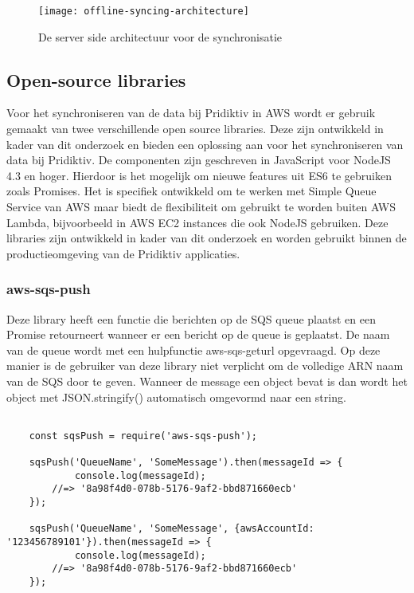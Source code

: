 \begin{figure}[h]
\caption{De server side architectuur voor de synchronisatie}
\centering
\texttt{[image: offline-syncing-architecture]}
\end{figure}

\subsection{Open-source libraries}
Voor het synchroniseren van de data bij Pridiktiv in AWS wordt er gebruik gemaakt van twee verschillende open source libraries. Deze zijn ontwikkeld in kader van dit onderzoek en bieden een oplossing aan voor het synchroniseren van data bij Pridiktiv. De componenten zijn geschreven in JavaScript voor NodeJS 4.3 en hoger. Hierdoor is het mogelijk om nieuwe features uit ES6 te gebruiken zoals Promises. Het is specifiek ontwikkeld om te werken met Simple Queue Service van AWS maar biedt de flexibiliteit om gebruikt te worden buiten AWS Lambda, bijvoorbeeld in AWS EC2 instances die ook NodeJS gebruiken. Deze libraries zijn ontwikkeld in kader van dit onderzoek en worden gebruikt binnen de productieomgeving van de Pridiktiv applicaties.
\subsubsection{aws-sqs-push}
Deze library heeft een functie die berichten op de SQS queue plaatst en een Promise retourneert wanneer er een bericht op de queue is geplaatst. De naam van de queue wordt met een hulpfunctie aws-sqs-geturl opgevraagd. Op deze manier is de gebruiker van deze library niet verplicht om de volledige ARN naam van de SQS door te geven. Wanneer de message een object bevat is dan wordt het object met JSON.stringify() automatisch omgevormd naar een string.
\clearpage

\begin{lstlisting}[caption=Voorbeeld dat data plaatst op een SQS queue met behulp van de aws-sqs-push library]

	const sqsPush = require('aws-sqs-push');

	sqsPush('QueueName', 'SomeMessage').then(messageId => {
    		console.log(messageId);
    	//=> '8a98f4d0-078b-5176-9af2-bbd871660ecb'
	});

	sqsPush('QueueName', 'SomeMessage', {awsAccountId: '123456789101'}).then(messageId => {
    		console.log(messageId);
    	//=> '8a98f4d0-078b-5176-9af2-bbd871660ecb'
	});
	
\end{lstlisting}
